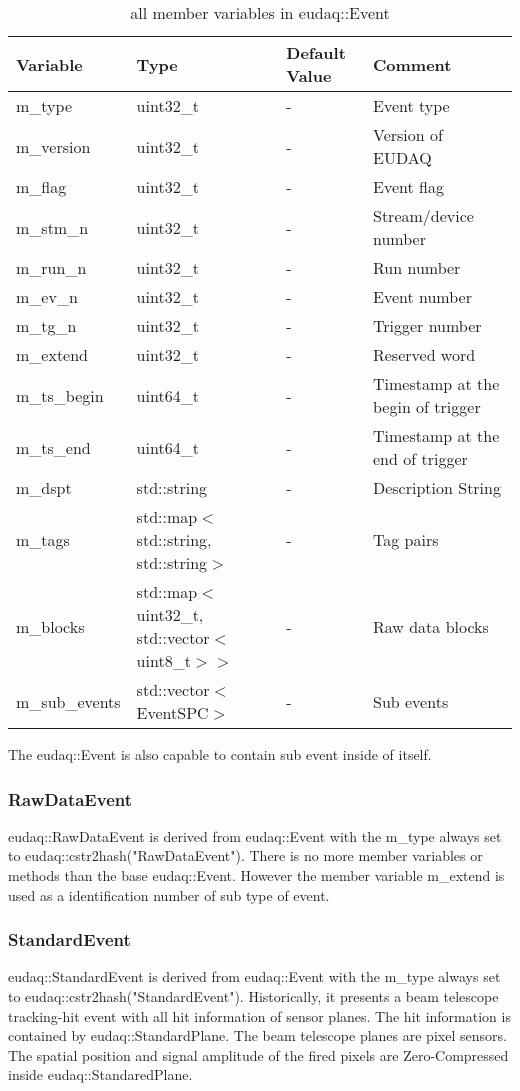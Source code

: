 \begin{table}[!h]
{\footnotesize
\begin{tabular}{l|l|p{2cm}|p{5.5cm}}
Variable & Type & Default Value & Comment \\
\hline
m\_type & uint32\_t & - & Event type\\
m\_version & uint32\_t & - & Version of EUDAQ\\
m\_flag & uint32\_t & - & Event flag\\
m\_stm\_n & uint32\_t & - & Stream/device number\\
m\_run\_n & uint32\_t & - & Run number\\
m\_ev\_n & uint32\_t & - & Event number\\
m\_tg\_n & uint32\_t & - & Trigger number\\
m\_extend & uint32\_t & - & Reserved word\\
m\_ts\_begin & uint64\_t & - & Timestamp at the begin of trigger\\
m\_ts\_end & uint64\_t & - & Timestamp at the end of trigger\\
m\_dspt & std::string & - & Description String\\
m\_tags & std::map$<$std::string, std::string$>$& - & Tag pairs\\
m\_blocks & std::map$<$uint32\_t, std::vector$<$uint8\_t$>>$ & - & Raw data blocks\\
m\_sub\_events & std::vector$<$EventSPC$>$& - & Sub events\\
\end{tabular}
\caption{all member variables in eudaq::Event}
\label{tab:eventvarialbe}
}
\end{table}

The eudaq::Event is also capable to contain sub event inside of itself. 

\subsubsection{RawDataEvent}\label{sec:convrawdata}
eudaq::RawDataEvent is derived from eudaq::Event with the m\_type always set to eudaq::cstr2hash("RawDataEvent"). There is no more member variables or methods than the base eudaq::Event. However the member variable m\_extend is used as a identification number of sub type of event.

\subsubsection{StandardEvent}\label{sec:convstddata}
eudaq::StandardEvent is derived from eudaq::Event with the m\_type always set to eudaq::cstr2hash("StandardEvent"). Historically, it presents a beam telescope tracking-hit event with all hit information of sensor planes. The hit information is contained by eudaq::StandardPlane. The beam telescope planes are pixel sensors. The spatial position and signal amplitude of the fired pixels are Zero-Compressed inside eudaq::StandaredPlane.

